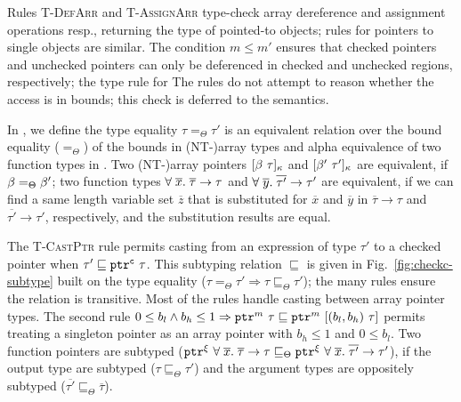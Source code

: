 %
Rules \textsc{T-DefArr} and \textsc{T-AssignArr} type-check array
dereference and assignment operations resp., returning the type of
pointed-to objects; rules for pointers to single objects are
similar.
The condition $m\le m'$ ensures that checked pointers and unchecked pointers 
can only be deferenced in checked and unchecked regions, respectively;
the type rule for
The rules do not attempt to reason whether the access is in bounds;
this check is deferred to the semantics.


%
In \systemname, we define the type equality $\tau=_{\Theta}\tau'$
is an equivalent relation over the bound equality ($=_{\Theta}$) of the bounds in (NT-)array types
and alpha equivalence of two function types in .
Two (NT-)array pointers $\tallarrayb{\bvar}{\tau} $ and $ \tallarrayb{\bvar'}{\tau'}$ are equivalent, if 
$\bvar =_{\Theta} \bvar'$; two function types 
$\tfun{\overline{x}}{\overline{\tau}}{\tau} $ and $ \tfun{\overline{y}}{\overline{\tau'}}{\tau'}$
are equivalent, if we can find a same length variable set $\overline{z}$ that is substituted for  
$\overline{x}$ and $\overline{y}$ in $\overline{\tau} \to {\tau}$ and $\overline{\tau'} \to {\tau'}$, respectively,
and the substitution results are equal.

 The \textsc{T-CastPtr} rule
permits casting from an expression of type $\tau'$ to a checked pointer when
$\tau' \sqsubseteq \tptr{\tau}{\cmode}$. This subtyping relation
$\sqsubseteq$ is given in Fig.~\ref{fig:checkc-subtype} built on the type equality
($\tau =_{\Theta} \tau'\Rightarrow\tau \sqsubseteq_{\Theta} \tau'$); the many
rules ensure the relation is transitive. Most of the rules handle
casting between array pointer types. The second rule 
$0\le b_l \wedge b_h \le 1 \Rightarrow \tptr{\tau}{m}\sqsubseteq
\tarrayptr{b_l}{b_h}{\tau}{m}$ permits treating a singleton
pointer as an array pointer with $b_h\le 1$ and $0 \le b_l$.
Two function pointers are subtyped ($\tptr{\tfun{\overline{x}}{\overline{\tau}}{\tau}}{\xi} \sqsubseteq_{\Theta} \tptr{\tfun{\overline{x}}{\overline{\tau'}}{\tau'}}{\xi}$), 
if the output type are subtyped ($\tau\sqsubseteq_{\Theta}\tau'$) and the argument types are oppositely subtyped ($\overline{\tau'}\sqsubseteq_{\Theta}\overline{\tau}$).

